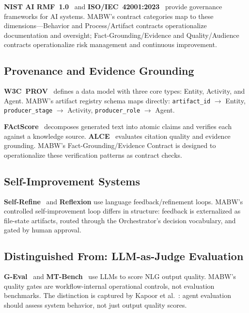 \documentclass[11pt,a4paper]{article}
\begin{document}
\textbf{NIST AI RMF~1.0}~\cite{nist_airmf} and \textbf{ISO/IEC~42001:2023}~\cite{iso42001} provide governance frameworks for AI systems. MABW's contract categories map to these dimensions---Behavior and Process/Artifact contracts operationalize documentation and oversight; Fact-Grounding/Evidence and Quality/Audience contracts operationalize risk management and continuous improvement.

\subsection{Provenance and Evidence Grounding}

\textbf{W3C~PROV}~\cite{w3c_prov} defines a data model with three core types: Entity, Activity, and Agent. MABW's artifact registry schema maps directly: \texttt{artifact\_id} $\rightarrow$ Entity, \texttt{producer\_stage} $\rightarrow$ Activity, \texttt{producer\_role} $\rightarrow$ Agent.

\textbf{FActScore}~\cite{min2023factscore} decomposes generated text into atomic claims and verifies each against a knowledge source. \textbf{ALCE}~\cite{gao2023alce} evaluates citation quality and evidence grounding. MABW's Fact-Grounding/Evidence Contract is designed to operationalize these verification patterns as contract checks.

\subsection{Self-Improvement Systems}

\textbf{Self-Refine}~\cite{madaan2023selfrefine} and \textbf{Reflexion} use language feedback/refinement loops. MABW's controlled self-improvement loop differs in structure: feedback is externalized as file-state artifacts, routed through the Orchestrator's decision vocabulary, and gated by human approval.

\subsection{Distinguished From: LLM-as-Judge Evaluation}

\textbf{G-Eval}~\cite{liu2023geval} and \textbf{MT-Bench}~\cite{zheng2023judging} use LLMs to score NLG output quality. MABW's quality gates are workflow-internal operational controls, not evaluation benchmarks. The distinction is captured by Kapoor et al.~\cite{kapoor2024agents}: agent evaluation should assess system behavior, not just output quality scores.
\end{document}
